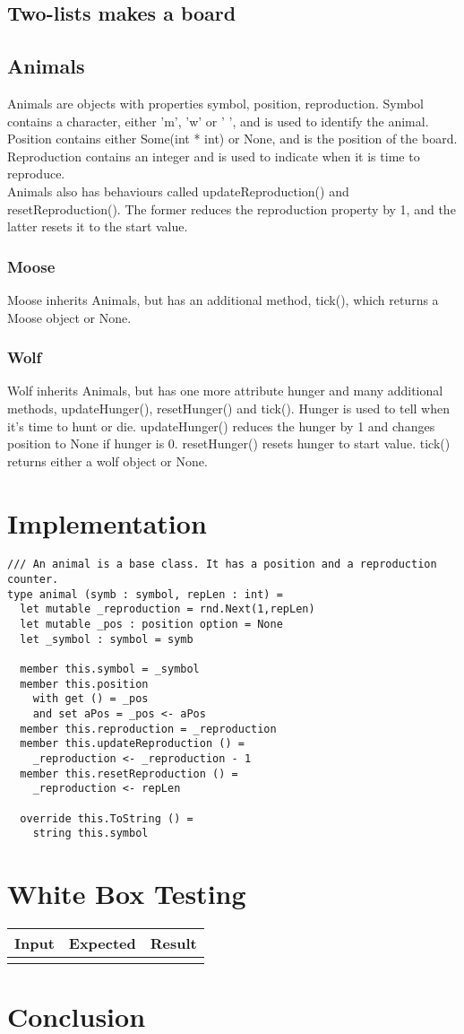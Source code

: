 \documentclass{article}
\begin{document}
    \subsection{Two-lists makes a board}
    \subsection{Animals}
    	Animals are objects with properties symbol, position, reproduction. Symbol contains a character, either 'm', 'w' or ' ', and is used to identify the animal. Position contains either Some(int * int) or None, and is the position of the board. Reproduction contains an integer and is used to indicate when it is time to reproduce.
    	\\
    	Animals also has behaviours called updateReproduction() and resetReproduction(). The former reduces the reproduction property by 1, and the latter resets it to the start value.
    \subsubsection{Moose}
    	Moose inherits Animals, but has an additional method, tick(), which returns a Moose object or None.
    \subsubsection{Wolf}    
		Wolf inherits Animals, but has one more attribute hunger and many additional methods, updateHunger(), resetHunger() and tick(). Hunger is used to tell when it's time to hunt or die. updateHunger() reduces the hunger by 1 and changes position to None if hunger is 0. resetHunger() resets hunger to start value. tick() returns either a wolf object or None. 
    \section{Implementation}
		\lstset{language=FSharp}

		\begin{lstlisting}
/// An animal is a base class. It has a position and a reproduction counter.
type animal (symb : symbol, repLen : int) =
  let mutable _reproduction = rnd.Next(1,repLen)
  let mutable _pos : position option = None
  let _symbol : symbol = symb

  member this.symbol = _symbol
  member this.position
    with get () = _pos
    and set aPos = _pos <- aPos
  member this.reproduction = _reproduction
  member this.updateReproduction () =
    _reproduction <- _reproduction - 1
  member this.resetReproduction () =
    _reproduction <- repLen

  override this.ToString () =
    string this.symbol
		\end{lstlisting}
		
         
    \section{White Box Testing}
   	   \begin{tabular}{|c|c|c|}
   	   		\hline
   	   		Input & Expected & Result\\
   	   		\hline
   	   		&&\\
   	   		\hline
   	   \end{tabular}
    \section{Conclusion}
     
\end{document}
